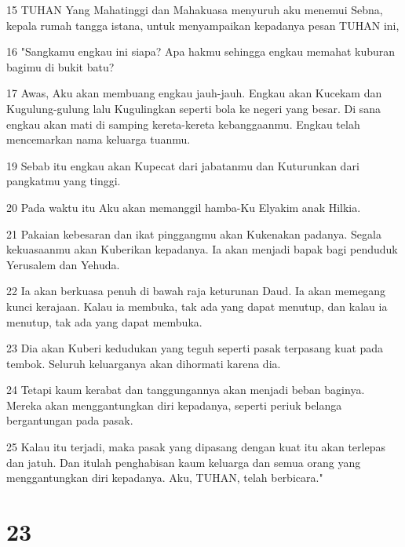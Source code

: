 \par 15 TUHAN Yang Mahatinggi dan Mahakuasa menyuruh aku menemui Sebna, kepala rumah tangga istana, untuk menyampaikan kepadanya pesan TUHAN ini,
\par 16 "Sangkamu engkau ini siapa? Apa hakmu sehingga engkau memahat kuburan bagimu di bukit batu?
\par 17 Awas, Aku akan membuang engkau jauh-jauh. Engkau akan Kucekam dan Kugulung-gulung lalu Kugulingkan seperti bola ke negeri yang besar. Di sana engkau akan mati di samping kereta-kereta kebanggaanmu. Engkau telah mencemarkan nama keluarga tuanmu.
\par 19 Sebab itu engkau akan Kupecat dari jabatanmu dan Kuturunkan dari pangkatmu yang tinggi.
\par 20 Pada waktu itu Aku akan memanggil hamba-Ku Elyakim anak Hilkia.
\par 21 Pakaian kebesaran dan ikat pinggangmu akan Kukenakan padanya. Segala kekuasaanmu akan Kuberikan kepadanya. Ia akan menjadi bapak bagi penduduk Yerusalem dan Yehuda.
\par 22 Ia akan berkuasa penuh di bawah raja keturunan Daud. Ia akan memegang kunci kerajaan. Kalau ia membuka, tak ada yang dapat menutup, dan kalau ia menutup, tak ada yang dapat membuka.
\par 23 Dia akan Kuberi kedudukan yang teguh seperti pasak terpasang kuat pada tembok. Seluruh keluarganya akan dihormati karena dia.
\par 24 Tetapi kaum kerabat dan tanggungannya akan menjadi beban baginya. Mereka akan menggantungkan diri kepadanya, seperti periuk belanga bergantungan pada pasak.
\par 25 Kalau itu terjadi, maka pasak yang dipasang dengan kuat itu akan terlepas dan jatuh. Dan itulah penghabisan kaum keluarga dan semua orang yang menggantungkan diri kepadanya. Aku, TUHAN, telah berbicara."

\chapter{23}


